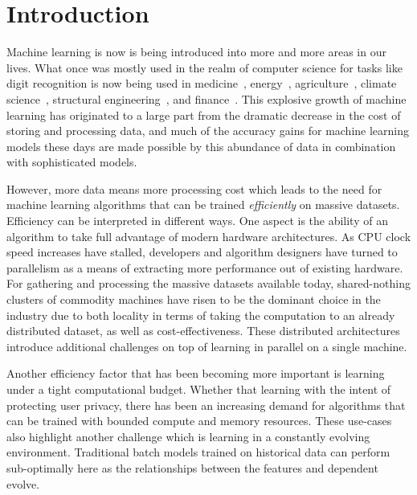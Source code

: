 \chapter{Introduction}

Machine learning is now is being introduced into more and more areas in
our lives. What once was mostly used in the realm of computer science for
tasks like digit recognition \cite{mnist} is now being used
in medicine~\cite{health-ml-1, health-ml-2}, energy~\cite{ml-building, ml-energy},
agriculture~\cite{ml-agriculture, ml-agriculture-2},
climate science~\cite{ml-climate-science}, structural engineering~\cite{ml-engineering},
and finance~\cite{ml-finance}. This explosive growth of machine learning has originated
to a large part from the dramatic decrease in the cost of storing and processing
data, and much of the accuracy gains for machine learning models these
days are made possible by this abundance of data in combination with sophisticated
models.

However, more data means more processing cost which leads to the need for
machine learning algorithms that can be trained \emph{efficiently} on massive
datasets. Efficiency can be interpreted in different ways. One
aspect is the ability of an algorithm to take full advantage of modern
hardware architectures. As CPU clock speed increases have stalled, developers
and algorithm designers have turned to parallelism as a means of
extracting more performance out of existing hardware.
For gathering and processing the massive datasets available today,
shared-nothing clusters of commodity machines have risen to
be the dominant choice in the industry due to both locality
in terms of taking the computation to an already distributed
dataset, as well as cost-effectiveness. These distributed
architectures introduce additional challenges on top of
learning in parallel on a single machine.

Another efficiency factor that has been becoming more important
is learning under a tight computational budget. Whether that
learning with the intent of protecting user privacy, there has
been an increasing demand for algorithms that can be trained
with bounded compute and memory resources.
These use-cases also highlight another challenge which is learning
in a constantly evolving environment. Traditional batch
models trained on historical data can perform sub-optimally here as the
relationships between the features and dependent evolve.

